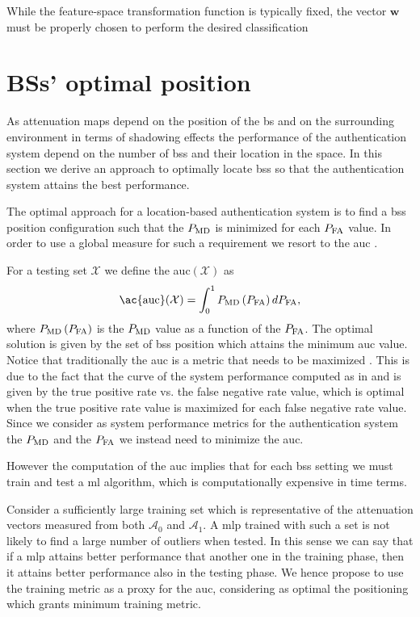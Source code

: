 \documentclass[twocolumns]{IEEEtran}
\begin{document}
While the feature-space transformation function is typically fixed, the vector $\mathbf{w}$ must be properly chosen to perform the desired classification

\section{BSs' optimal position}\label{sec:bsPos}
As attenuation maps depend on the position of the \ac{bs} and on the surrounding environment in terms of shadowing effects the performance of the authentication system depend on the number of \acp{bs} and their location in the space. In this section we derive an approach to optimally locate \acp{bs} so that the authentication system attains the best performance. 

The optimal approach for a location-based authentication system is to find a \acp{bs} position configuration such that the $P_{\rm MD}$ is minimized for each $P_{\rm FA}$ value. In order to use a global measure for such a requirement we resort to the \ac{auc} \cite{hanley-82}. 

For a testing set $\mathcal{X}$ we define the \ac{auc}$(\mathcal{X})$ as
\begin{equation}
    \text{\ac{auc}}(\mathcal{X}) = \int_{0}^{1} P_{\rm MD}\left(P_{\rm FA}\right) d P_{\rm FA},
\end{equation}
where $P_{\rm MD}\left(P_{\rm FA}\right)$ is the $P_{\rm MD}$ value as a function of the $P_{\rm FA}$.
The optimal solution is given by the set of \acp{bs} position which attains the minimum \ac{auc} value. Notice that traditionally the \ac{auc} is a metric that needs to be maximized \cite{hanley-82}. This is due to the fact that the curve of the system performance computed as in \cite{hanley-82} and \cite{Kennedy-11} is given by the true positive rate vs. the false negative rate value, which is optimal when the true positive rate value is maximized for each false negative rate value. Since we consider as system performance metrics for the authentication system the $P_{\rm MD}$ and the $P_{\rm FA}$ we instead need to minimize the \ac{auc}. 

However the computation of the \ac{auc} implies that for each \acp{bs} setting we must train and test a \ac{ml} algorithm, which is computationally expensive in time terms. 

Consider a sufficiently large training set which is representative of the attenuation vectors measured from both $\mathcal{A}_0$ and $\mathcal{A}_1$. A \ac{mlp} trained with such a set is not likely to find a large number of outliers when tested. In this sense we can say that if a \ac{mlp} attains better performance that another one in the training phase, then it attains better performance also in the testing phase. We hence propose to use the training metric as a proxy for the \ac{auc}, considering as optimal the positioning which grants minimum training metric.
\end{document}
